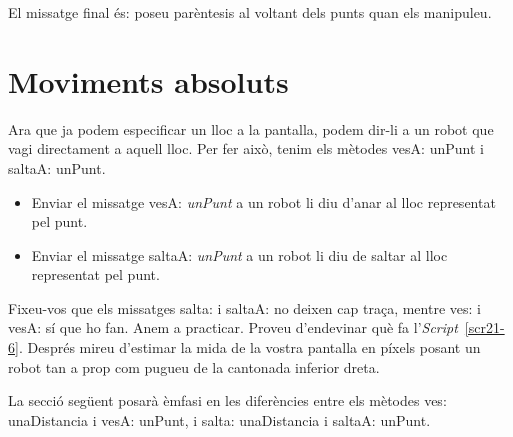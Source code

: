 El missatge final és: poseu parèntesis al voltant dels punts quan els manipuleu.  

\section{Moviments absoluts}
Ara que ja podem especificar un lloc a la pantalla, podem dir-li a un robot que vagi directament a aquell lloc. Per fer això, tenim els mètodes \textsf{vesA: unPunt} i \textsf{saltaA: unPunt}.
\begin{itemize}
\item Enviar el missatge \textsf{vesA: {\itshape unPunt}} a un robot li diu d'anar al lloc representat pel punt. 
\item Enviar el missatge \textsf{saltaA: {\itshape unPunt}} a un robot li diu de saltar al lloc representat pel punt. 
\end{itemize}

Fixeu-vos que els missatges \textsf{salta:} i \textsf{saltaA:} no deixen cap traça, mentre \textsf{ves:} i \textsf{vesA:} sí que ho fan. Anem a practicar. Proveu d'endevinar què fa l'\emph{Script}~\ref{scr21-6}. Després mireu d'estimar la mida de la vostra pantalla en píxels posant un robot tan a prop com pugueu de la cantonada inferior dreta.


La secció següent posarà èmfasi en les diferències entre els mètodes \textsf{ves: unaDistancia} i \textsf{vesA: unPunt}, i \textsf{salta: unaDistancia} i \textsf{saltaA: unPunt}.     

